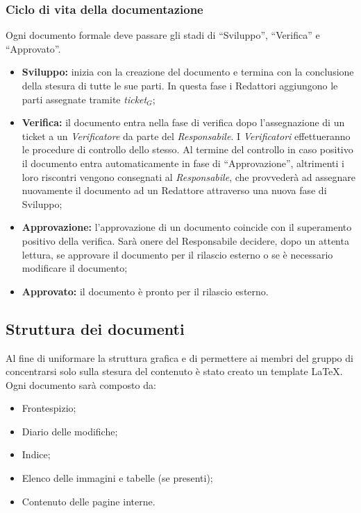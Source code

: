\subsubsection{Ciclo di vita della documentazione}
Ogni documento formale deve passare gli stadi di ``Sviluppo”, ``Verifica” e ``Approvato”.
\begin{itemize}
	\item \textbf{Sviluppo:} inizia con la creazione del documento e termina con la conclusione	della stesura di tutte le sue parti. In questa fase i Redattori aggiungono le parti assegnate tramite \textit{ticket$_{G}$};
	
	\item  \textbf{Verifica:} il documento entra nella fase di verifica dopo l’assegnazione di un ticket a un \textit{Verificatore} da
	parte del \textit{Responsabile}. I \textit{Verificatori} effettueranno le procedure di controllo
	dello stesso.
	Al termine del controllo in caso positivo il documento entra automaticamente
	in fase di ``Approvazione”, altrimenti i loro riscontri vengono consegnati
	al \textit{Responsabile}, che provvederà ad assegnare nuovamente il
	documento ad un Redattore attraverso una nuova fase di Sviluppo;
	
	\item  \textbf{Approvazione:} l’approvazione di un documento coincide con il superamento
	positivo della verifica.
	Sarà onere del Responsabile decidere, dopo un attenta lettura, se approvare il documento per il rilascio esterno o se è necessario modificare il documento;

	
	\item  \textbf{Approvato:} il documento è pronto per il rilascio esterno.
\end{itemize}


\subsection{Struttura dei documenti}
Al fine di uniformare la struttura grafica e di permettere ai membri del gruppo di concentrarsi solo sulla stesura del contenuto è stato creato un template \LaTeX.
Ogni documento sarà composto da:
\begin{itemize}
	\item Frontespizio;
	\item Diario delle modifiche;
	\item Indice;
	\item Elenco delle immagini e tabelle (se presenti);
	\item Contenuto delle pagine interne.
\end{itemize}
